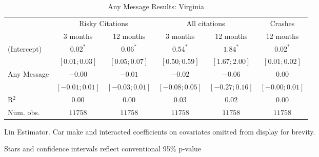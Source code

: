 
\begin{table}
\caption{Any Message Results: Virginia}
\begin{center}
\begin{threeparttable}
\begin{tabular}{l c c c c c}
\hline
 & \multicolumn{2}{c}{Risky Citations} & \multicolumn{2}{c}{All citations} & \multicolumn{1}{c}{Crashes} \\
\cline{2-3} \cline{4-5} \cline{6-6}
 & 3 months & 12 months & 3 months & 12 months & 12 months \\
\hline
(Intercept) & $0.02^{*}$       & $0.06^{*}$       & $0.54^{*}$       & $1.84^{*}$       & $0.02^{*}$       \\
            & $ [ 0.01; 0.03]$ & $ [ 0.05; 0.07]$ & $ [ 0.50; 0.59]$ & $ [ 1.67; 2.00]$ & $ [ 0.01; 0.02]$ \\
Any Message & $-0.00$          & $-0.01$          & $-0.02$          & $-0.06$          & $0.00$           \\
            & $ [-0.01; 0.01]$ & $ [-0.03; 0.01]$ & $ [-0.08; 0.05]$ & $ [-0.27; 0.16]$ & $ [-0.00; 0.01]$ \\
\hline
R$^2$       & $0.00$           & $0.00$           & $0.03$           & $0.02$           & $0.00$           \\
Num. obs.   & $11758$          & $11758$          & $11758$          & $11758$          & $11758$          \\
\hline
\end{tabular}
\begin{tablenotes}[flushleft]
\scriptsize{\item Lin Estimator. Car make and interacted coefficients on covariates omitted from display for brevity.
                             \item Stars and confidence intervals reflect conventional 95\% p-value}
\end{tablenotes}
\end{threeparttable}
\label{table:coefficients}
\end{center}
\end{table}
